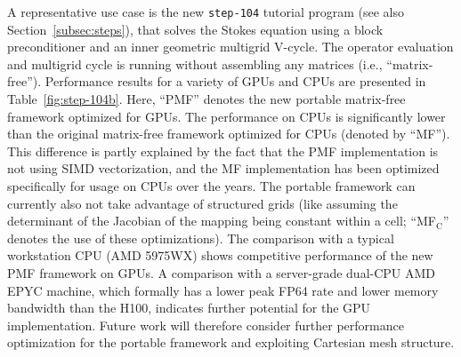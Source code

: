 \documentclass{ansarticle-preprint}
\newcommand{\specialword}[1]{\texttt{#1}}
\newcommand{\step}[1]{{\specialword{step-#1}}\xspace}
\begin{document}
A representative use case is the new \step{104} tutorial program (see also
Section~\ref{subsec:steps}), that solves the Stokes equation using a block
preconditioner and an inner geometric multigrid V-cycle. The operator
evaluation and multigrid cycle is running without assembling any matrices
(i.e., ``matrix-free''). Performance results for a variety of GPUs and CPUs
are presented in Table~\ref{fig:step-104b}.
Here, ``PMF'' denotes the new portable matrix-free framework optimized for GPUs. The performance on CPUs is significantly lower than the original matrix-free framework optimized for CPUs (denoted by ``MF''). This difference is partly explained by the fact that the PMF implementation is not using SIMD vectorization, and the MF implementation has been optimized specifically for usage on CPUs over the years. The portable
framework can currently also not take advantage of structured grids (like assuming the determinant of the Jacobian of the mapping being constant within a cell; ``MF$_{\text{C}}$'' denotes the use of these optimizations).
The comparison with a typical workstation CPU (AMD 5975WX) shows competitive performance of the new PMF framework on GPUs.
A comparison with a server-grade dual-CPU AMD EPYC machine, which formally
has a lower peak FP64 rate and lower memory bandwidth than the H100, indicates further
potential for the GPU implementation. Future work will therefore consider further performance optimization for the portable framework and exploiting Cartesian mesh structure.
\end{document}

